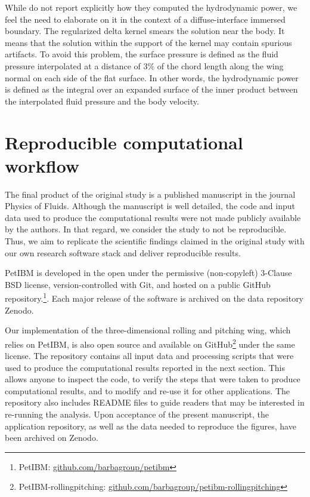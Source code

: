 While \citet{li_dong_2016} do not report explicitly how they computed the hydrodynamic power, we feel the need to elaborate on it in the context of a diffuse-interface immersed boundary.
The regularized delta kernel smears the solution near the body.
It means that the solution within the support of the kernel may contain spurious artifacts.
To avoid this problem, the surface pressure is defined as the fluid pressure interpolated at a distance of $3\%$ of the chord length along the wing normal on each side of the flat surface.
In other words, the hydrodynamic power is defined as the integral over an expanded surface of the inner product between the interpolated fluid pressure and the body velocity.

\section{Reproducible computational workflow}

The final product of the original study is a published manuscript in the journal Physics of Fluids.
Although the manuscript is well detailed, the code and input data used to produce the computational results were not made publicly available by the authors.
In that regard, we consider the study to not be reproducible.
Thus, we aim to replicate the scientific findings claimed in the original study with our own research software stack and deliver reproducible results.

PetIBM\supercite{chuang_et_al_2018} is developed in the open under the permissive (non-copyleft) 3-Clause BSD license, version-controlled with Git, and hosted on a public GitHub repository.\footnote{PetIBM: \url{github.com/barbagroup/petibm}}.
Each major release of the software is archived on the data repository Zenodo.

Our implementation of the three-dimensional rolling and pitching wing, which relies on PetIBM, is also open source and available on GitHub\footnote{PetIBM-rollingpitching: \url{github.com/barbagroup/petibm-rollingpitching}} under the same license.
The repository contains all input data and processing scripts that were used to produce the computational results reported in the next section.
This allows anyone to inspect the code, to verify the steps that were taken to produce computational results, and to modify and re-use it for other applications.
The repository also includes \textsc{README} files to guide readers that may be interested in re-running the analysis.
Upon acceptance of the present manuscript, the application repository, as well as the data needed to reproduce the figures, have been archived on Zenodo.

